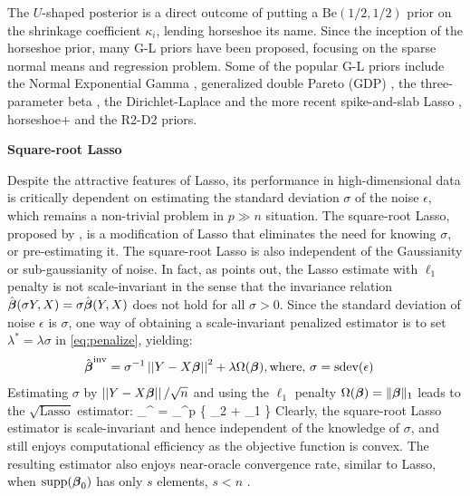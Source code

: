 \documentclass[10pt]{article}
\begin{document}
The $U$-shaped posterior is a direct outcome of putting a $\text{Be}(1/2,1/2)$ prior on the shrinkage coefficient $\kappa_i$, lending horseshoe its name. Since the inception of the horseshoe prior, many G-L priors have been proposed, focusing on the sparse normal means and regression problem. Some of the popular G-L priors include the Normal Exponential Gamma \citep{griffin2005alternative}, generalized double Pareto (GDP) \citep{armagan2013generalized}, the three-parameter beta \citep{armagan2011generalized}, the Dirichlet-Laplace \citep{bhattacharya2014dirichlet} and the more recent spike-and-slab Lasso \citep{rovckova2016spike}, horseshoe+ \citep{bhadra2015horseshoe+} and the R2-D2 \citep{zhang2016high} priors. 


\noindent \textbf{Square-root Lasso} 

Despite the attractive features of Lasso, its performance in high-dimensional data is critically dependent on estimating the standard deviation $\sigma$ of the noise $\epsilon$, which remains a non-trivial problem in $p \gg n$ situation. The square-root Lasso, proposed by \cite{belloni2011square}, is a modification of Lasso that eliminates the need for knowing $\sigma$, or pre-estimating it. The square-root Lasso is also independent of the Gaussianity or sub-gaussianity of noise. In fact, as \citet{giraud2014introduction} points out, the Lasso estimate with $\ell_1$ penalty is not scale-invariant in the sense that the invariance relation $\hat{\boldsymbol{\beta}}(\sigma Y, X) = \sigma \hat{\boldsymbol{\beta}}(Y, X)$ does not hold for all $\sigma > 0$. Since the standard deviation of noise $\epsilon$ is $\sigma$, one way of obtaining a scale-invariant penalized estimator is to set $\lambda^* = \lambda \sigma$ in \eqref{eq:penalize}, yielding:
\begin{align}
\hat{\boldsymbol{\beta}}^{\text{inv}} & = \sigma^{-1} \left|\left|Y - X\boldsymbol{\beta}\right|\right|^2 + \lambda \Omega(\boldsymbol{\beta}), \text{where, } \sigma = \text{sdev}(\epsilon)
\end{align}
Estimating $\sigma$ by $\left|\left|Y-X\boldsymbol{\beta}\right|\right|/\sqrt{n}$ and using the $\ell_1$ penalty $\Omega(\boldsymbol{\beta}) = \lVert\boldsymbol{\beta}\rVert_1$ leads to the $\sqrt{\text{Lasso}}$ estimator: 
\beq
\hat{\bbeta}_{\lambda}^{} = \argmin_{\bbeta \in \Re^p} \{  _2 + \lambda \norm{\bbeta}_1 \} \label{eq:sqlasso}
\eeq
Clearly, the square-root Lasso estimator is scale-invariant and hence independent of the knowledge of $\sigma$, and still enjoys computational efficiency as the objective function is convex. The resulting estimator also enjoys near-oracle convergence rate, similar to Lasso, when $\text{supp}(\boldsymbol{\beta}_0)$ has only $s$ elements, $s < n$ \citep{belloni2011square}. 
\end{document}
